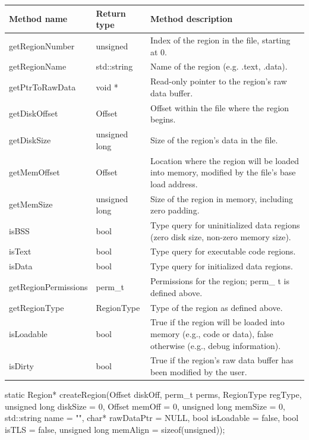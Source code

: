\begin{tabularx}{\textwidth}{llX}
\toprule
Method name & Return type & Method description \\
\midrule
getRegionNumber & unsigned & Index of the region in the file, starting at 0. \\
getRegionName & std::string & Name of the region (e.g. .text, .data). \\
getPtrToRawData & void * & Read-only pointer to the region's raw data buffer. \\
getDiskOffset & Offset & Offset within the file where the region begins. \\
getDiskSize & unsigned long & Size of the region's data in the file. \\
getMemOffset & Offset & Location where the region will be loaded into memory, modified by the file's base load address. \\
getMemSize & unsigned long & Size of the region in memory, including zero padding. \\
isBSS & bool & Type query for uninitialized data regions (zero disk size, non-zero memory size). \\
isText & bool & Type query for executable code regions. \\
isData & bool & Type query for initialized data regions. \\
getRegionPermissions & perm\_t & Permissions for the region; perm\_ t is defined above. \\
getRegionType & RegionType & Type of the region as defined above. \\
isLoadable & bool & True if the region will be loaded into memory (e.g., code or data), false otherwise (e.g., debug information). \\
isDirty & bool & True if the region's raw data buffer has been modified by the user. \\
\bottomrule
\end{tabularx}

\begin{apient}
static Region* createRegion(Offset diskOff,
                            perm_t perms,
                            RegionType regType,
                            unsigned long diskSize = 0,
                            Offset memOff = 0,
                            unsigned long memSize = 0,
                            std::string name = "",
                            char* rawDataPtr = NULL,
                            bool isLoadable = false,
                            bool isTLS = false,
                            unsigned long memAlign = sizeof(unsigned));
\end{apient}

